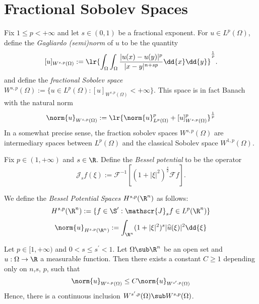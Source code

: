 \documentclass[../main.tex]{subfiles}
\begin{document}
\section{Fractional Sobolev Spaces}

\begin{definition}\label{fracnorms}
    Fix $ 1\leq p <+\infty $ and let $ s\in (0,1) $ be a fractional exponent. For $ u\in L^{p}(\Omega) $, define the \textit{Gagliardo (semi)norm} of $ u $ to be the quantity
    \[
        [u]_{W^{s,p}(\Omega)} := \lr{\int_{\Omega}\int_{\Omega} \frac{|u(x)-u(y)|^{p}}{|x-y|^{n+sp}}\dd{x}\dd{y}}^{\frac{1}{p}}.
    \]
    and define the \textit{fractional Sobolev space} $ W^{s,p}(\Omega):= \{u\in L^{p}(\Omega):[u]_{W^{s,p}(\Omega)}<+\infty\} $. This space is in fact Banach with the natural norm
    \[
        \norm{u}_{W^{s,p}(\Omega)} := \lr{\norm{u}_{L^{p}(\Omega)}^{p}+[u]_{W^{s,p}(\Omega)}^{p}}^{\frac{1}{p}}
    \]
    In a somewhat precise sense, the fraction sobolev spaces $ W^{s,p}(\Omega) $ are intermediary spaces between $ L^{p}(\Omega) $ and the classical Sobolev space $ W^{1,p}(\Omega) $.
\end{definition}

\begin{definition}\label{besselspace}
    Fix $ p\in (1,+\infty) $ and $ s\in \R $. Define the \textit{Bessel potential} to be the operator
    \[
        \mathscr{J}_{s}f(\xi):= \mathscr{F}^{-1}\left[(1+| \xi|^{2})^{\frac{s}{2}}\mathscr{F}f\right].
    \]

    We define the \textit{Bessel Potential Spaces} $ H^{s,p}(\R^{n}) $ as follows:
    \[
        H^{s,p}(\R^{n}) := \{f\in \S^{\prime} : \mathscr{J}_{s}f \in L^{p}(\R^{n})\}
    \]
    \[
        \norm{u}_{H^{s,p}(\R^{n})}:= \int_{\R^{n}}(1+| \xi|^{2})^{s}|\widehat{u} (\xi)|^{2}\dd{\xi}
    \]
\end{definition}




\begin{proposition}
    Let $ p\in[1,+\infty) $ and $ 0 < s \leq s^{\prime} < 1 $. Let $ \Omega\sub \R^{n} $ be an open set and $ u:\Omega\to \R $ a measurable function. Then there exists a constant $ C \geq 1 $ depending only on $ n$,$s$, $p$, such that
    \[
        \norm{u}_{W^{s,p}(\Omega)} \leq C\norm{u}_{W^{s^{\prime},p}(\Omega)}
    \]
    Hence, there is a continuous inclusion $ W^{s^{\prime},p}(\Omega)\sub W^{s,p}(\Omega)$.
\end{proposition}
\end{document}
